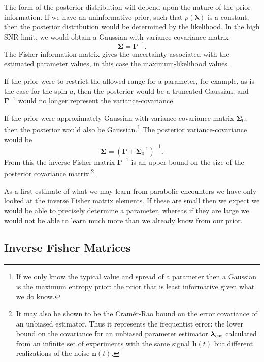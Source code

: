 The form of the posterior distribution will depend upon the nature of the prior information. If we have an uninformative prior, such that $p(\boldsymbol{\lambda})$ is a constant, then the posterior distribution would be determined by the likelihood. In the high SNR limit, we would obtain a Gaussian with variance-covariance matrix
\begin{equation}
\boldsymbol{\Sigma} = \boldsymbol{\Gamma}^{-1}.
\end{equation}
The Fisher information matrix gives the uncertainty associated with the estimated parameter values, in this case the maximum-likelihood values.

If the prior were to restrict the allowed range for a parameter, for example, as is the case for the spin $a$, then the posterior would be a truncated Gaussian, and $\boldsymbol{\Gamma}^{-1}$ would no longer represent the variance-covariance.

If the prior were approximately Gaussian with variance-covariance matrix $\boldsymbol{\Sigma}_0$, then the posterior would also be Gaussian.\footnote{If we only know the typical value and spread of a parameter then a Gaussian is the maximum entropy prior\cite{Jaynes2003}: the prior that is least informative given what we do know.} The posterior variance-covariance would be\cite{Cutler1994, Vallisneri2008}
\begin{equation}
\boldsymbol{\Sigma} = \left(\boldsymbol{\Gamma} + \boldsymbol{\Sigma}_0^{-1}\right)^{-1}.
\label{eq:Posterior_variance}
\end{equation}
From this the inverse Fisher matrix $\boldsymbol{\Gamma}^{-1}$ is an upper bound on the size of the posterior covariance matrix.\footnote{It may also be shown to be the Cram\'{e}r-Rao bound on the error covariance of an unbiased estimator\cite{Cutler1994, Vallisneri2008}. Thus it represents the frequentist error: the lower bound on the covariance for an unbiased parameter estimator $\boldsymbol{\lambda}_\mathrm{est}$ calculated from an infinite set of experiments with the same signal $\boldsymbol{h}(t)$ but different realizations of the noise $\boldsymbol{n}(t)$.}

As a first estimate of what we may learn from parabolic encounters we have only looked at the inverse Fisher matrix elements. If these are small then we expect we would be able to precisely determine a parameter, whereas if they are large we would not be able to learn much more than we already know from our prior.

\subsection{Inverse Fisher Matrices}

